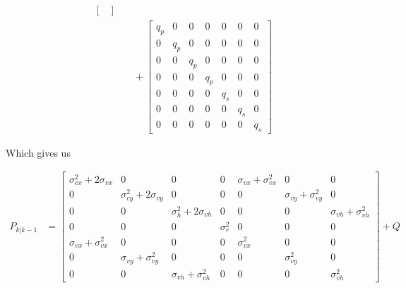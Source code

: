 \documentclass[10pt]{article}
\begin{document}
\begin{align*}
\begin{bmatrix}
            \end{bmatrix} \\
            &\quad +
            \begin{bmatrix}
            q_p & 0 & 0 & 0 & 0 & 0 & 0 \\
            0 & q_p & 0 & 0 & 0 & 0 & 0 \\
            0 & 0 & q_p & 0 & 0 & 0 & 0 \\
            0 & 0 & 0 & q_p & 0 & 0 & 0 \\
            0 & 0 & 0 & 0 & q_s & 0 & 0 \\
            0 & 0 & 0 & 0 & 0 & q_s & 0 \\
            0 & 0 & 0 & 0 & 0 & 0 & q_s
            \end{bmatrix}
    \end{align*}

    \noindent Which gives us
    
    \begin{align}
        P_{k|k-1} &= \begin{bmatrix}
            \sigma^2_{cx} + 2\sigma_{vx} & 0 & 0 & 0 & \sigma_{vx} + \sigma^2_{vx} & 0 & 0 \\
            0 & \sigma^2_{cy} + 2\sigma_{vy} & 0 & 0 & 0 & \sigma_{vy} + \sigma^2_{vy} & 0 \\
            0 & 0 & \sigma^2_{h} + 2\sigma_{vh} & 0 & 0 & 0 & \sigma_{vh} + \sigma^2_{vh} \\
            0 & 0 & 0 & \sigma^2_{r} & 0 & 0 & 0 \\
            \sigma_{vx} + \sigma^2_{vx} & 0 & 0 & 0 & \sigma^2_{vx} & 0 & 0 \\
            0 & \sigma_{vy} + \sigma^2_{vy} & 0 & 0 & 0 & \sigma^2_{vy} & 0 \\
            0 & 0 & \sigma_{vh} + \sigma^2_{vh} & 0 & 0 & 0 & \sigma^2_{vh} 
        \end{bmatrix} + Q
        \label{Eq:Cov_Predict_Full}
    \end{align}
    
\end{document}
